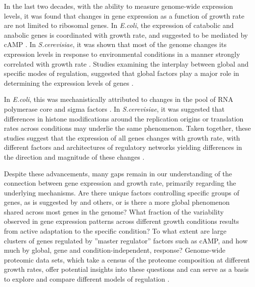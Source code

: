 \documentclass[10pt,letterpaper]{article}
\begin{document}
In the last two decades, with the ability to measure genome-wide expression levels, it was found that changes in gene expression as a function of growth rate are not limited to ribosomal genes.
In \emph{E.coli}, the expression of catabolic and anabolic genes is coordinated with growth rate, and suggested to be mediated by cAMP \cite{Saldanha2004,You_2013,Peebo_2015}.
In \emph{S.cerevisiae}, it was shown that most of the genome changes its expression levels in response to environmental conditions in a manner strongly correlated with growth rate \cite{Keren2013,Brauer2008,Castrillo2007,Gerosa2013}.
Studies examining the interplay between global and specific modes of regulation, suggested that global factors play a major role in determining the expression levels of genes \cite{Gasch2000,Klumpp2009,Klumpp2014,Scott2010,Scott2011,Scott2014,Berthoumieux2013,Keren2013,Gerosa2013,Valgepea2013,Hui_2015,Weise2015}.

In \emph{E.coli}, this was mechanistically attributed to changes in the pool of RNA polymerase core and sigma factors \cite{Klumpp2008}.
In \emph{S.cerevisiae}, it was suggested that differences in histone modifications around the replication origins \cite{Regenberg2006} or translation rates \cite{Brauer2008} across conditions may underlie the same phenomenon.
Taken together, these studies suggest that the expression of all genes changes with growth rate, with different factors and architectures of regulatory networks yielding differences in the direction and magnitude of these changes \cite{Klumpp2009,Klumpp2014}.

Despite these advancements, many gaps remain in our understanding of the connection between gene expression and growth rate, primarily regarding the underlying mechanisms.
Are there unique factors controlling specific groups of genes, as is suggested by \cite{You_2013,Peebo_2015,Hui_2015,Bosdriesz_2015} and others, or is there a more global phenomenon shared across most genes in the genome?
What fraction of the variability observed in gene expression patterns across different growth conditions results from active adaptation to the specific condition?
To what extent are large clusters of genes regulated by ''master regulator'' factors such as cAMP, and how much by global, gene and condition-independent, response?
Genome-wide proteomic data sets, which take a census of the proteome composition at different growth rates, offer potential insights into these questions and can serve as a basis to explore and compare different models of regulation \cite{Valgepea2013,Schmidt2015,Hui_2015,Peebo_2015}.
\end{document}
